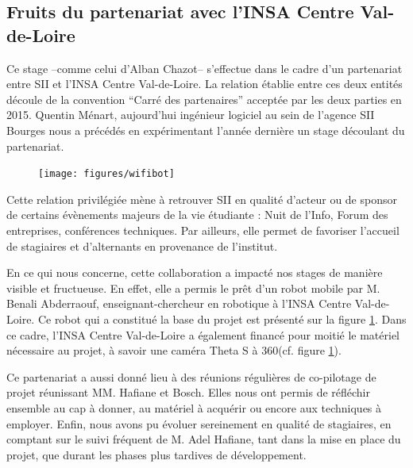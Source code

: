 \subsection{Fruits du partenariat avec l'INSA Centre Val-de-Loire}

Ce stage --comme celui d'Alban Chazot-- s'effectue dans le cadre d'un partenariat entre SII et l'INSA Centre Val-de-Loire. 
La relation établie entre ces deux entités découle de la convention ``Carré des partenaires'' acceptée par les deux parties en 2015.
Quentin Ménart, aujourd'hui ingénieur logiciel au sein de l'agence SII Bourges nous a précédés en expérimentant l'année dernière un stage découlant du partenariat.  

\begin{figure}[h]
    \centering
    \texttt{[image: figures/wifibot]}
    \label{fig:Wifibot}
\end{figure}


Cette relation privilégiée mène à retrouver SII en qualité d'acteur ou de sponsor de certains évènements majeurs de la vie étudiante : Nuit de l'Info, Forum des entreprises, conférences techniques.
Par ailleurs, elle permet de favoriser l'accueil de stagiaires et d'alternants en provenance de l'institut.  

En ce qui nous concerne, cette collaboration a impacté nos stages de manière visible et fructueuse.
En effet, elle a permis le prêt d'un robot mobile par M. Benali Abderraouf, enseignant-chercheur en robotique à l'INSA Centre Val-de-Loire. 
Ce robot qui a constitué la base du projet est présenté sur la figure \ref{fig:Wifibot}.
Dans ce cadre, l'INSA Centre Val-de-Loire a également financé pour moitié le matériel nécessaire au projet, à savoir une caméra Theta S à 360\degre (cf. figure \ref{fig:Wifibot}).

Ce partenariat a aussi donné lieu à des réunions régulières de co-pilotage de projet réunissant MM. Hafiane et Bosch. 
Elles nous ont permis de réfléchir ensemble au cap à donner, au matériel à acquérir ou encore aux techniques à employer.
Enfin, nous avons pu évoluer sereinement en qualité de stagiaires, en comptant sur le suivi fréquent de M. Adel Hafiane, tant dans la mise en place du projet, que durant les phases plus tardives de développement.
